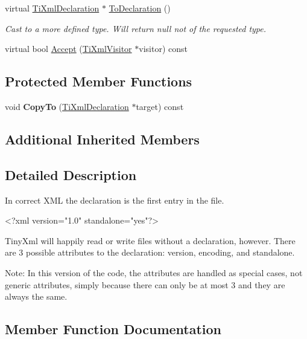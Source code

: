 \begin{DoxyCompactItemize}
\mbox{\label{classTiXmlDeclaration_a6bd3d1daddcaeb9543c24bfd090969ce}} 
virtual \hyperlink{classTiXmlDeclaration}{Ti\+Xml\+Declaration} $\ast$ \hyperlink{classTiXmlDeclaration_a6bd3d1daddcaeb9543c24bfd090969ce}{To\+Declaration} ()
\begin{DoxyCompactList}\small\item\em Cast to a more defined type. Will return null not of the requested type. \end{DoxyCompactList}\item 
virtual bool \hyperlink{classTiXmlDeclaration_aa1b6bade6c989407ce9881bdfc73c1e6}{Accept} (\hyperlink{classTiXmlVisitor}{Ti\+Xml\+Visitor} $\ast$visitor) const
\end{DoxyCompactItemize}
\subsection*{Protected Member Functions}
\begin{DoxyCompactItemize}
\item 
\mbox{\label{classTiXmlDeclaration_a189de17b3e04d4e5b1c385336f214af1}} 
void {\bfseries Copy\+To} (\hyperlink{classTiXmlDeclaration}{Ti\+Xml\+Declaration} $\ast$target) const
\end{DoxyCompactItemize}
\subsection*{Additional Inherited Members}


\subsection{Detailed Description}
In correct X\+ML the declaration is the first entry in the file. \begin{DoxyVerb}    <?xml version="1.0" standalone="yes"?>
\end{DoxyVerb}


Tiny\+Xml will happily read or write files without a declaration, however. There are 3 possible attributes to the declaration\+: version, encoding, and standalone.

Note\+: In this version of the code, the attributes are handled as special cases, not generic attributes, simply because there can only be at most 3 and they are always the same. 

\subsection{Member Function Documentation}
\mbox{\label{classTiXmlDeclaration_aa1b6bade6c989407ce9881bdfc73c1e6}} 
